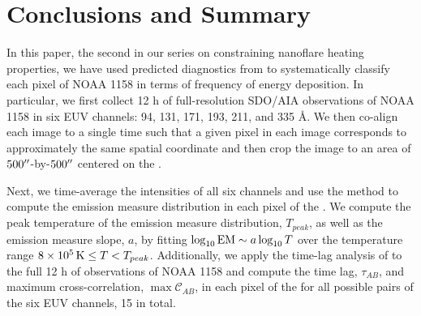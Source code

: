 \section{Conclusions and Summary}\label{sec:conclusions}



In this paper, the second in our series on constraining nanoflare heating properties, we have used predicted diagnostics from  to systematically classify each pixel of \AR{} NOAA 1158 in terms of frequency of energy deposition.
In particular, we first collect 12 h of full-resolution SDO/AIA observations of NOAA 1158 in six EUV channels: 94, 131, 171, 193, 211, and 335 \AA.
We then co-align each image to a single time such that a given pixel in each image corresponds to approximately the same spatial coordinate and then crop the image to an area of $500\mbox{$^{\prime\prime}$}$-by-$500\mbox{$^{\prime\prime}$}$ centered on the \AR{}.

Next, we time-average the intensities of all six channels and use the method \citet{hannah_differential_2012} to compute the emission measure distribution in each pixel of the \AR{}.
We compute the peak temperature of the emission measure distribution, $T_{peak}$, as well as the emission measure slope, $a$, by fitting $\log_{10}\textup{EM}\sim a\log_{10}T$ over the temperature range $8\times10^5\,\textup{K}\le T < T_{peak}$. 
Additionally, we apply the time-lag analysis of \citet{viall_evidence_2012} to the full 12 h of observations of NOAA 1158 and compute the time lag, $\tau_{AB}$, and maximum cross-correlation, $\max\mathcal{C}_{AB}$, in each pixel of the \AR{} for all possible pairs of the six EUV channels, 15 in total.

